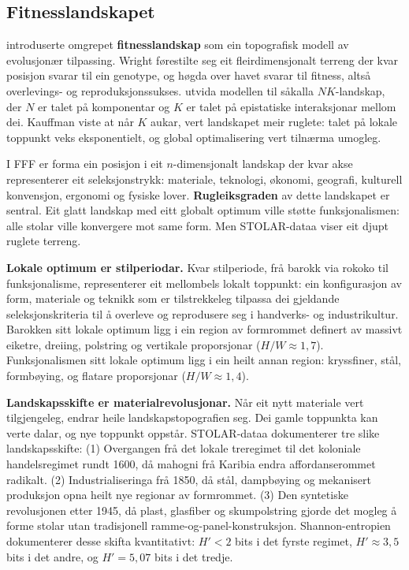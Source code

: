 \documentclass[12pt, a4paper]{article}
\begin{document}
\subsection{Fitnesslandskapet}

\citet{wright1932} introduserte omgrepet \textbf{fitnesslandskap} som ein topografisk modell av evolusjonær tilpassing. Wright førestilte seg eit fleirdi\-men\-sjonalt terreng der kvar posisjon svarar til ein genotype, og høgda over havet svarar til fitness, altså overlevings- og reproduksjonssukses. \citet{kauffman1993} utvida modellen til såkalla $NK$-landskap, der $N$ er talet på komponentar og $K$ er talet på epistatiske interaksjonar mellom dei. Kauffman viste at når $K$ aukar, vert landskapet meir ruglete: talet på lokale toppunkt veks eksponentielt, og global optimalisering vert tilnærma umogleg.

I FFF er forma ein posisjon i eit $n$-dimensjonalt landskap der kvar akse representerer eit seleksjonstrykk: materiale, teknologi, økonomi, geografi, kulturell konvensjon, ergonomi og fysiske lover. \textbf{Rugleiksgraden} av dette landskapet er sentral. Eit glatt landskap med eitt globalt optimum ville støtte funksjonalismen: alle stolar ville konvergere mot same form. Men STOLAR-dataa viser eit djupt ruglete terreng.

\textbf{Lokale optimum er stilperiodar.} Kvar stilperiode, frå barokk via rokoko til funksjonalisme, representerer eit mellombels lokalt toppunkt: ein konfigurasjon av form, materiale og teknikk som er tilstrekkeleg tilpassa dei gjeldande seleksjonskriteria til å overleve og reprodusere seg i handverks- og industrikultur. Barokken sitt lokale optimum ligg i ein region av formrommet definert av massivt eiketre, dreiing, polstring og vertikale proporsjonar ($H/W \approx 1{,}7$). Funksjonalismen sitt lokale optimum ligg i ein heilt annan region: kryssfiner, stål, formbøying, og flatare proporsjonar ($H/W \approx 1{,}4$).

\textbf{Landskapsskifte er materialrevolusjonar.} Når eit nytt materiale vert tilgjengeleg, endrar heile landskapstopografien seg. Dei gamle toppunkta kan verte dalar, og nye toppunkt oppstår. STOLAR-dataa dokumenterer tre slike landskapsskifte: (1) Overgangen frå det lokale treregimet til det koloniale handelsregimet rundt 1600, då mahogni frå Karibia endra affordanserommet radikalt. (2) Industrialiseringa frå 1850, då stål, dampbøying og mekanisert produksjon opna heilt nye regionar av formrommet. (3) Den syntetiske revolusjonen etter 1945, då plast, glasfiber og skumpolstring gjorde det mogleg å forme stolar utan tradisjonell ramme-og-panel-konstruksjon. Shannon-entropien dokumenterer desse skifta kvantitativt: $H' < 2$ bits i det fyrste regimet, $H' \approx 3{,}5$ bits i det andre, og $H' = 5{,}07$ bits i det tredje.
\end{document}
